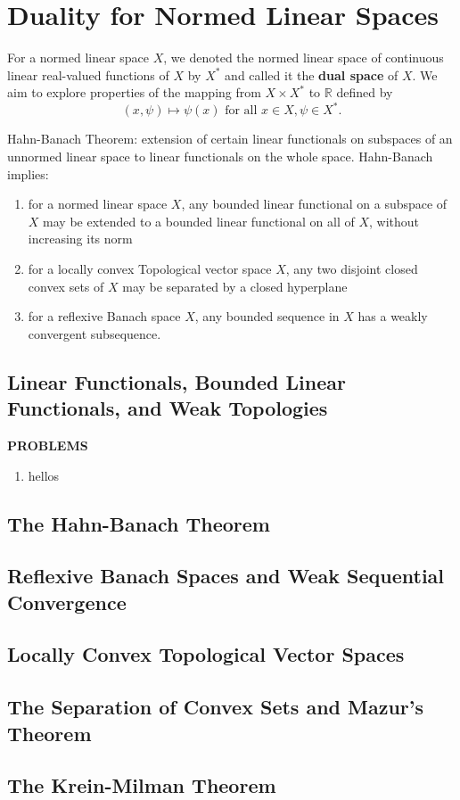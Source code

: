 \chapter{Duality for Normed Linear Spaces}

For a normed linear space $X$, we denoted the normed linear space of continuous linear real-valued functions of $X$ by $X^*$ and called it the \textbf{dual space} of $X$.
We aim to explore properties of the mapping from $X\times X^*$ to $\mathbb{R}$ defined by
\[
    (x,\psi)\mapsto\psi(x)\text{ for all }x\in X,\psi\in X^*.
\]

Hahn-Banach Theorem: extension of certain linear functionals on subspaces of an unnormed linear space to linear functionals on the whole space.
Hahn-Banach implies:
\begin{enumerate}
    \item for a normed linear space $X$, any bounded linear functional on a subspace of $X$ may be extended to a bounded linear functional on all of $X$, without increasing its norm
    \item for a locally convex Topological vector space $X$, any two disjoint closed convex sets of $X$ may be separated by a closed hyperplane
    \item for a reflexive Banach space $X$, any bounded sequence in $X$ has a weakly convergent subsequence.
\end{enumerate}

\section{Linear Functionals, Bounded Linear Functionals, and Weak Topologies}



\begin{center}
	\textbf{PROBLEMS}
\end{center}
\begin{enumerate}
	\setcounter{enumi}{0}
    \item hellos
\end{enumerate}

\section{The Hahn-Banach Theorem}

\section{Reflexive Banach Spaces and Weak Sequential Convergence}

\section{Locally Convex Topological Vector Spaces}

\section{The Separation of Convex Sets and Mazur's Theorem}

\section{The Krein-Milman Theorem}

